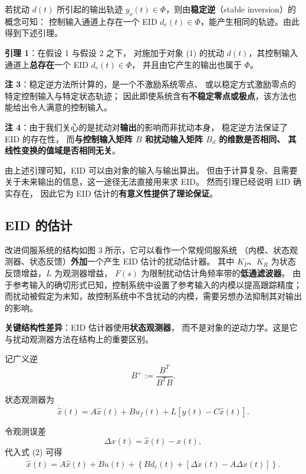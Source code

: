 \documentclass[11pt,a4paper]{ctexart}
\begin{document}
若扰动 $d(t)$ 所引起的输出轨迹 $y_o(t)\in\Phi$，则由\textbf{稳定逆}（stable inversion）的概念可知：
控制输入通道上存在一个 EID $d_e(t)\in\Phi$，能产生相同的轨迹。由此得到下述引理。

\textbf{引理 1}：在假设 1 与假设 2 之下，
对施加于对象 (1) 的扰动 $d(t)$，其控制输入通道上\textbf{总存在}一个 EID $d_e(t)\in\Phi$，
并且由它产生的输出也属于 $\Phi$。

\textbf{注 3}：稳定逆方法所计算的，是一个不激励系统零点、
或以稳定方式激励零点的特定控制输入与特定状态轨迹；
因此即使系统含有\textbf{不稳定零点或极点}，该方法也能给出令人满意的控制输入。

\textbf{注 4}：由于我们关心的是扰动对\textbf{输出}的影响而非扰动本身，
稳定逆方法保证了 EID 的存在性，
而\textbf{与控制输入矩阵 $B$ 和扰动输入矩阵 $B_d$ 的维数是否相同、
其线性变换的值域是否相同无关}。

由上述引理可知，EID 可以由对象的输入与输出算出。
但由于计算复杂、且需要关于未来输出的信息，这一途径无法直接用来求 EID。
然而引理已经说明 EID 确实存在，
因此它为 EID 估计的\textbf{有意义性提供了理论保证}。

\subsection{EID 的估计}

改进伺服系统的结构如图 3 所示，它可以看作一个常规伺服系统
（内模、状态观测器、状态反馈）\textbf{外加}一个产生 EID 估计的扰动估计器。
其中 $K_P$、$K_R$ 为状态反馈增益，$L$ 为观测器增益，
$F(s)$ 为限制扰动估计角频率带的\textbf{低通滤波器}。
由于参考输入的确切形式已知，控制系统中设置了参考输入的内模以提高跟踪精度；
而扰动被假定为未知，故控制系统中不含扰动的内模，需要另想办法抑制其对输出的影响。

\textbf{关键结构性差异}：EID 估计器使用\textbf{状态观测器}，
而不是对象的逆动力学。这是它与扰动观测器方法在结构上的重要区别。

记广义逆
\begin{equation}
B^{+}:=\frac{B^{T}}{B^{T}B}.
\end{equation}

状态观测器为
\begin{equation}
\dot{\hat x}(t)=A\hat x(t)+B u_f(t)+L\left[y(t)-C\hat x(t)\right].
\end{equation}

令观测误差
\begin{equation}
\Delta x(t)=\hat x(t)-x(t),
\end{equation}
代入式 (2) 可得
\begin{equation}
\dot{\hat x}(t)=A\hat x(t)+B u(t)
+\left\{B d_e(t)+\left[\Delta\dot x(t)-A\Delta x(t)\right]\right\}.
\end{equation}
\end{document}
